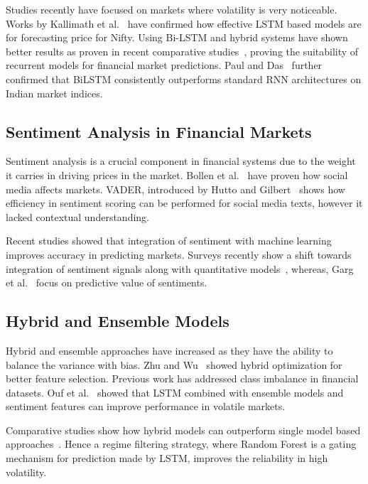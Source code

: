 \documentclass[twocolumn]{article}
\begin{document}
Studies recently have focused on markets where volatility is very noticeable. Works by Kallimath et al.~\cite{kallimath2024nifty} have confirmed how effective LSTM based models are for forecasting price for Nifty. Using Bi-LSTM and hybrid systems have shown better results as proven in recent comparative studies~\cite{barua2024comparative}, proving the suitability of recurrent models for financial market predictions. Paul and Das~\cite{paul2024bilstm} further confirmed that BiLSTM consistently outperforms standard RNN architectures on Indian market indices.

\subsection{Sentiment Analysis in Financial Markets}

Sentiment analysis is a crucial component in financial systems due to the weight it carries in driving prices in the market. Bollen et al.~\cite{bollen2011twitter} have proven how social media affects markets. VADER, introduced by Hutto and Gilbert~\cite{hutto2014vader} shows how efficiency in sentiment scoring can be performed for social media texts, however it lacked contextual understanding.

Recent studies showed that integration of sentiment with machine learning improves accuracy in predicting markets. Surveys recently show a shift towards integration of sentiment signals along with quantitative models~\cite{chandra2025survey,bhardwaj2015india}, whereas, Garg et al.~\cite{garg2024ipo} focus on predictive value of sentiments.

\subsection{Hybrid and Ensemble Models}

Hybrid and ensemble approaches have increased as they have the ability to balance the variance with bias. Zhu and Wu~\cite{zhu2024hybrid} showed hybrid optimization for better feature selection. Previous work has addressed class imbalance in financial datasets. Ouf et al.~\cite{ouf2024sentiment} showed that LSTM combined with ensemble models and sentiment features can improve performance in volatile markets. 

Comparative studies show how hybrid models can outperform single model based approaches~\cite{maqbool2024sentiment}. Hence a regime filtering strategy, where Random Forest is a gating mechanism for prediction made by LSTM, improves the reliability in high volatility.
\end{document}
